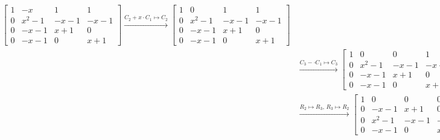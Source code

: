 \begin{answer}
\begin{equation}
\begin{aligned}
            \left[
            \begin{matrix}
            1 & -x & 1 & 1 \\
            0 & x^2-1 & -x-1 & -x-1 \\
            0 & -x-1 & x+1 & 0 \\
            0 & -x-1 & 0 & x+1
            \end{matrix}
            \right]\xrightarrow{C_2+x\cdot C_1 \mapsto C_2}
            \left[
            \begin{matrix}
            1 & 0 & 1 & 1 \\
            0 & x^2-1 & -x-1 & -x-1 \\
            0 & -x-1 & x+1 & 0 \\
            0 & -x-1 & 0 & x+1
            \end{matrix}
            \right]\\
            &\xrightarrow{C_3-\cdot C_1 \mapsto C_3}
            \left[
            \begin{matrix}
            1 & 0 & 0 & 1 \\
            0 & x^2-1 & -x-1 & -x-1 \\
            0 & -x-1 & x+1 & 0 \\
            0 & -x-1 & 0 & x+1
            \end{matrix}
            \right]\xrightarrow{C_4-\cdot C_1 \mapsto C_4}
            \left[
            \begin{matrix}
            1 & 0 & 0 & 0 \\
            0 & x^2-1 & -x-1 & -x-1 \\
            0 & -x-1 & x+1 & 0 \\
            0 & -x-1 & 0 & x+1
            \end{matrix}
            \right]\\
            &\xrightarrow{R_2 \mapsto R_3, \, R_3 \mapsto R_2}
            \left[
            \begin{matrix}
            1 & 0 & 0 & 0 \\
            0 & -x-1 & x+1 & 0 \\
            0 & x^2-1 & -x-1 & -x-1 \\
            0 & -x-1 & 0 & x+1
            \end{matrix}
            \right]\xrightarrow{R_3 - (-x+1)\cdot R_2 \mapsto R_3}
            \left[
            \begin{matrix}
            1 & 0 & 0 & 0 \\

\end{matrix}
\end{aligned}
\end{equation}
\end{answer}
